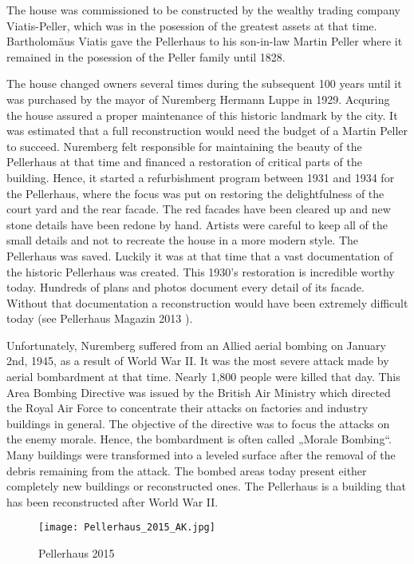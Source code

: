 The house was commissioned to be constructed by the wealthy trading company Viatis-Peller, which was in the posession of the greatest assets at that time. Bartholomäus Viatis gave the Pellerhaus to his son-in-law Martin Peller where it remained in the posession of the Peller family until 1828.

The house changed owners several times during the subsequent 100 years until it was purchased by the mayor of Nuremberg Hermann Luppe in 1929. Acquring the house assured a proper maintenance of this historic landmark by the city. It was estimated that a full reconstruction would need the budget of a Martin Peller to succeed. Nuremberg felt responsible for maintaining the beauty of the Pellerhaus at that time and financed a restoration of critical parts of the building. Hence, it started a refurbishment program between 1931 and 1934 for the Pellerhaus, where the focus was put on restoring the delightfulness of the court yard and the rear facade. The red facades have been cleared up and new stone details have been redone by hand. Artists were careful to keep all of the small details and not to recreate the house in a more modern style. The Pellerhaus was saved. Luckily it was at that time that a vast documentation of the historic Pellerhaus was created. This 1930's restoration is incredible worthy today. Hundreds of plans and photos document every detail of its facade. Without that documentation a reconstruction would have been extremely difficult today (see Pellerhaus Magazin 2013 \parencite{afPellerhausMagazin02}).

Unfortunately, Nuremberg suffered from an Allied aerial bombing on January 2nd, 1945, as a result of World War II. It was the most severe attack made by aerial bombardment at that time. Nearly 1,800 people were killed that day. This Area Bombing Directive was issued by the British Air Ministry which directed the Royal Air Force to concentrate their attacks on factories and industry buildings in general. The objective of the directive was to focus the attacks on the enemy morale. Hence, the bombardment is often called „Morale Bombing“. Many buildings were transformed into a leveled surface after the removal of the debris remaining from the attack. The bombed areas today present either completely new buildings or reconstructed ones. The Pellerhaus is a building that has been reconstructed after World War II.

\pagebreak

\begin{wrapfigure}{l}{0.5\textwidth}
	
	\centering
	
	\texttt{[image: Pellerhaus\_2015\_AK.jpg]}
	\caption{Pellerhaus 2015}
	\label{fig:pellerhaus_2015}
	\vspace{-10pt}
	
\end{wrapfigure}

